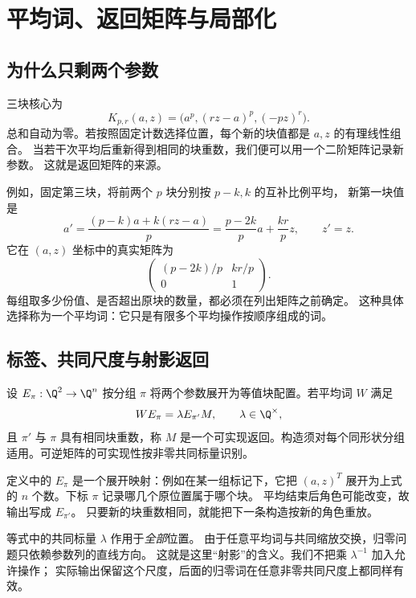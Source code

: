 \chapter{平均词、返回矩阵与局部化}\label{sec:arithmetic}

\section{为什么只剩两个参数}
三块核心为
\[
K_{p,r}(a,z)=\bigl(a^p,(rz-a)^p,(-pz)^r\bigr).
\]
总和自动为零。若按照固定计数选择位置，每个新的块值都是 $a,z$ 的有理线性组合。
当若干次平均后重新得到相同的块重数，我们便可以用一个二阶矩阵记录新参数。
这就是返回矩阵的来源。

例如，固定第三块，将前两个 $p$ 块分别按 $p-k,k$ 的互补比例平均，
新第一块值是
\[
a'=\frac{(p-k)a+k(rz-a)}p
   =\frac{p-2k}{p}a+\frac{kr}{p}z,
\qquad z'=z.
\]
它在 $(a,z)$ 坐标中的真实矩阵为
\[
\begin{pmatrix}(p-2k)/p&kr/p\\0&1\end{pmatrix}.
\]
每组取多少份值、是否超出原块的数量，都必须在列出矩阵之前确定。
这种具体选择称为一个平均词：它只是有限多个平均操作按顺序组成的词。

\section{标签、共同尺度与射影返回}

\begin{definition}\label{def:return}
设 $E_\pi:\Q^2\to\Q^n$ 按分组 $\pi$ 将两个参数展开为等值块配置。若平均词 $W$ 满足
\begin{equation}\label{eq:return}
WE_\pi=\lambda E_{\pi'}M,\qquad \lambda\in\Q^\times,
\end{equation}
且 $\pi'$ 与 $\pi$ 具有相同块重数，称 $M$ 是一个可实现返回。构造须对每个同形状分组适用。可逆矩阵的可实现性按非零共同标量识别。
\end{definition}

定义中的 $E_\pi$ 是一个展开映射：例如在某一组标记下，它把 $(a,z)^T$
展开为上式的 $n$ 个数。下标 $\pi$ 记录哪几个原位置属于哪个块。
平均结束后角色可能改变，故输出写成 $E_{\pi'}$。
只要新的块重数相同，就能把下一条构造按新的角色重放。

等式中的共同标量 $\lambda$ 作用于\emph{全部}位置。
由于任意平均词与共同缩放交换，归零问题只依赖参数列的直线方向。
这就是这里“射影”的含义。我们不把乘 $\lambda^{-1}$ 加入允许操作；
实际输出保留这个尺度，后面的归零词在任意非零共同尺度上都同样有效。

